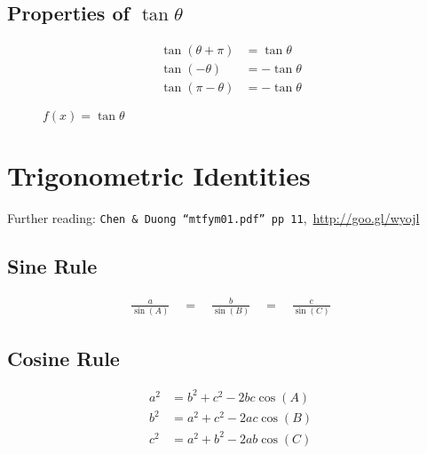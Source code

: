 \subsection{Properties of $\tan\theta$}
\label{subsec:TR Trigonometric Functions - tan}
\begin{align}
  \tan(\theta + \pi) & = \tan\theta \\
  \tan(-\theta) & = -\tan\theta \\
  \tan(\pi - \theta) & = -\tan\theta
\end{align}
\begin{center}
\begin{figure}[!htb]
\label{fig:tanx}
\caption{$f(x) = \tan\theta$}
\end{figure}
\end{center}

\section{Trigonometric Identities}
\label{sec:TR Trigonometric Identities}
Further reading: \texttt{Chen \& Duong ``mtfym01.pdf'' pp 11},\, \url{http://goo.gl/wyojl}

\subsection{Sine Rule}
\label{subsec:TR Trigonometric Identities - Sine Rule}

\begin{align}
  \frac{a}{\sin(A)} \quad = \quad \frac{b}{\sin(B)} \quad = \quad \frac{c}{\sin(C)}
\end{align}

\subsection{Cosine Rule}
\label{subsec:TR Trigonometric Identities - Cosine Rule}

\begin{align}
  a^2 &= b^2 + c^2 - 2bc\cos(A) \\[0.5cm]
  b^2 &= a^2 + c^2 - 2ac\cos(B) \\[0.5cm]
  c^2 &= a^2 + b^2 - 2ab\cos(C)
\end{align}

